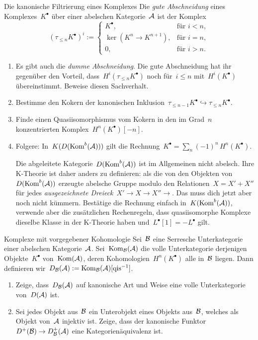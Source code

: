 \documentclass{uebblatt}
\begin{document}

\begin{aufgabe}{Die kanonische Filtrierung eines Komplexes}
Die \emph{gute Abschneidung} eines Komplexes~$K^\bullet$ über einer abelschen
Kategorie~$\mathcal{A}$ ist der Komplex
\[ (\tau_{\leq n} K^\bullet)^i := \begin{cases}
  K^\bullet, & \text{für $i < n$}, \\
  \ker(K^n \to K^{n+1}), & \text{für $i = n$}, \\
  0, & \text{für $i > n$}.
\end{cases} \]

\begin{enumerate}
\item Es gibt auch die \emph{dumme Abschneidung}. Die gute Abschneidung hat ihr
gegenüber den Vorteil, dass~$H^i(\tau_{\leq n} K^\bullet)$ noch für~$i \leq n$
mit~$H^i(K^\bullet)$ übereinstimmt. Beweise diesen Sachverhalt.
\item Bestimme den Kokern der kanonischen Inklusion~$\tau_{\leq n-1}K^\bullet
\hookrightarrow \tau_{\leq n}K^\bullet$.
\item Finde einen Quasiisomorphismus vom Kokern in den im Grad~$n$
konzentrierten Komplex~$H^n(K^\bullet)[-n]$.
\item Folgere: In~$K(D(\mathrm{Kom}^b(\mathcal{A})))$ gilt die
Rechnung~$K^\bullet = \sum_n (-1)^n\, H^n(K^\bullet)$.

{\scriptsize
Die abgeleitete Kategorie~$D(\mathrm{Kom}^b(\mathcal{A}))$ ist im Allgemeinen nicht abelsch.
Ihre K-Theorie ist daher anders zu definieren: als die von den Objekten
von~$D(\mathrm{Kom}^b(\mathcal{A}))$ erzeugte abelsche Gruppe modulo den Relationen~$X = X' +
X''$ für jedes \emph{ausgezeichnete Dreieck}~$X' \to X \to X'' \to$. Das muss dich
jetzt aber noch nicht kümmern. Bestätige die Rechnung einfach
in~$K(\mathrm{Kom}^b(\mathcal{A}))$, verwende aber die zusätzlichen Rechenregeln, dass
quasiisomorphe Komplexe dieselbe Klasse in der K-Theorie haben
und~$L^\bullet[1] = -L^\bullet$ gilt.
\par}
\end{enumerate}
\end{aufgabe}

\begin{aufgabe}{Komplexe mit vorgegebener Kohomologie}
Sei~$\mathcal{B}$ eine Serresche Unterkategorie einer abelschen Kategorie~$\mathcal{A}$.
Sei~$\mathrm{Kom}_{\mathcal{B}}(\mathcal{A})$ die volle Unterkategorie derjenigen Objekte~$K^\bullet$
von~$\mathrm{Kom}(\mathcal{A})$, deren Kohomologien~$H^n(K^\bullet)$ alle in~$\mathcal{B}$ liegen.
Dann definieren wir~$D_{\mathcal{B}}(\mathcal{A}) := \mathrm{Kom}_{\mathcal{B}}(\mathcal{A})[\text{qis}^{-1}]$.
\begin{enumerate}
\item Zeige, dass~$D_{\mathcal{B}}(\mathcal{A})$ auf kanonische Art und Weise eine volle
Unterkategorie von~$D(\mathcal{A})$ ist.
\item Sei jedes Objekt aus~$\mathcal{B}$ ein Unterobjekt eines Objekts aus~$\mathcal{B}$, welches
als Objekt von~$\mathcal{A}$ injektiv ist. Zeige, dass der kanonische Funktor~$D^+(\mathcal{B})
\to D^+_{\mathcal{B}}(\mathcal{A})$ eine Kategorienäquivalenz ist.
\end{enumerate}
\end{aufgabe}
\end{document}
